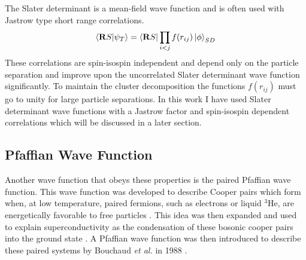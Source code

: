 
The Slater determinant is a mean-field wave function and is often used with Jastrow type short range correlations.
\begin{equation}
   \left< \mathbf{R} S | \psi_T \right> = \left< \mathbf{R} S \right|\prod\limits_{i<j}f(r_{ij}) \left| \phi \right>_{SD}
   \label{equ:jastrow}
\end{equation}
These correlations are spin-isospin independent and depend only on the particle separation and improve upon the uncorrelated Slater determinant wave function significantly. To maintain the cluster decomposition the functions $f(r_{ij})$ must go to unity for large particle separations. In this work I have used Slater determinant wave functions with a Jastrow factor and spin-isospin dependent correlations which will be discussed in a later section.

\subsection{Pfaffian Wave Function}
Another wave function that obeys these properties is the paired Pfaffian wave function. This wave function was developed to describe Cooper pairs which form when, at low temperature, paired fermions, such as electrons or liquid $^3$He, are energetically favorable to free particles \cite{cooper1956,leggett1975}. This idea was then expanded and used to explain superconductivity as the condensation of these bosonic cooper pairs into the ground state \cite{bardeen1957,bardeen1957_2}. A Pfaffian wave function was then introduced to describe these paired systems by Bouchaud {\it et al.} in 1988 \cite{bouchaud1988}.

